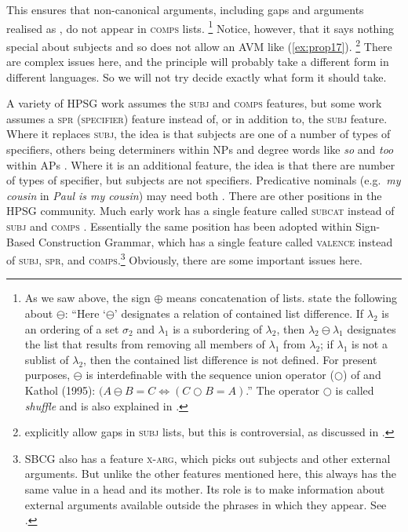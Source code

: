 \documentclass[output=paper
	        ,collection
	        ,collectionchapter
 	        ,biblatex
                ,babelshorthands
                ,newtxmath
                ,draftmode
                ,colorlinks, citecolor=brown
]{langscibook}
\begin{document}
\noindent
This ensures that non-canonical arguments, including gaps and arguments realised as , do not appear in \textsc{comps} lists.%
%
\footnote{As we saw above, the sign $\oplus$ means concatenation of lists. \citet[]{GSag2000a-u} state the
  following about $\ominus$: ``Here `$\ominus$' designates a relation of contained list difference. If
$\lambda_2$ is an ordering of a set $\sigma_2$ and $\lambda_1$ is a subordering of $\lambda_2$, then
$\lambda_2 \ominus \lambda_1$ designates the list that results from removing all members of
$\lambda_1$ from $\lambda_2$; if $\lambda_1$ is not a sublist of $\lambda_2$, then the contained
list difference is not defined. For present purposes, $\ominus$ is interdefinable with the sequence
union operator ($\bigcirc$\is{$\bigcirc$}) of
\citet{Reape94a} and Kathol (1995): $(A \ominus B = C \Leftrightarrow (C \bigcirc B = A)$.'' The
operator $\bigcirc$ is called \emph{shuffle} and is also explained in \crossrefchapterw[\page \pageref{rel-shuffle}]{order}.}
%
Notice, however, that it says nothing special about subjects and so does not allow an AVM like (\ref{ex:prop17}).%
%
\footnote{\citet[177--183]{GSag2000a-u} explicitly allow gaps in \textsc{subj} lists, but this is
  controversial, as discussed in \crossrefchapterw[\page
  \pageref{udc:page-subject-gaps-start}--\pageref{udc:page-subject-gaps-end}]{udc}.}
%
There are complex issues here, and the principle will probably take a different form in different languages. So we will not try decide exactly what form it should take.

A variety of HPSG work assumes the \textsc{subj} and \textsc{comps} features, but some work assumes
a \textsc{spr (specifier)} feature instead of, or in addition to, the \textsc{subj} feature. Where it
replaces \textsc{subj}, the idea is that subjects are one of a number of types of specifiers, others
being determiners within NPs and degree words like \emph{so} and \emph{too} within APs
\citep[]{ps2}. Where it is an additional feature, the idea is that there are number of
types of specifier, but subjects are not specifiers. Predicative nominals (e.g.\ \emph{my cousin} in
\emph{Paul is my cousin}) may need both
\parencites[Section~9.4.1]{ps2}[409]{GSag2000a-u}{AG2003b-u}. There are other positions in the HPSG 
community. Much early work has a single feature called \textsc{subcat}
instead of \textsc{subj} and \textsc{comps} \citep{ps}. Essentially the same position has been
adopted within Sign-Based Construction Grammar, which has a single feature called \textsc{valence}
instead of \textsc{subj}, \textsc{spr}, and \textsc{comps}.\footnote{%
  SBCG also has a feature \textsc{x-arg}, which picks out subjects and other external arguments. But
  unlike the other features mentioned here, this always has the same value in a head and its
  mother. Its role is to make information about external arguments available outside the phrases in
  which they appear.  See \citet[84, 149--151]{Sag2007a,Sag2012a}.} 
%
Obviously, there are some important issues here.
\end{document}
